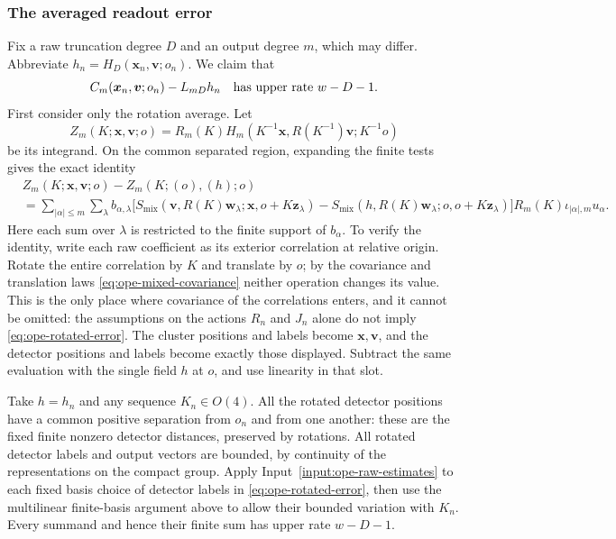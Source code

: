 \subsubsection{The averaged readout error}
Fix a raw truncation degree $D$ and an output degree $m$, which may differ.
Abbreviate
$h_n=H_D(\boldsymbol x_n,\boldsymbol v;o_n)$. We claim that
\begin{equation}\label{eq:ope-average-bridge}
 C_m(\boldsymbol x_n,\boldsymbol v;o_n)-L_{mD}h_n
                 \quad\hbox{has upper rate }w-D-1.
\end{equation}
First consider only the rotation average. Let
\[
 Z_m(K;\boldsymbol x,\boldsymbol v;o)
       =R_m(K)H_m(K^{-1}\boldsymbol x,R(K^{-1})\boldsymbol v;K^{-1}o)
\]
be its integrand. On the common separated region, expanding the finite
tests gives the exact identity
\begin{align}
 &Z_m(K;\boldsymbol x,\boldsymbol v;o)
                  -Z_m(K;(o),(h);o)\nonumber\\
 &=\sum_{|\alpha|\leq m}\sum_\lambda b_{\alpha,\lambda}
   \bigl[S_{\mathrm{mix}}(\boldsymbol v,R(K)\boldsymbol w_\lambda;
                 \boldsymbol x,o+K\boldsymbol z_\lambda)
       -S_{\mathrm{mix}}(h,R(K)\boldsymbol w_\lambda;
                 o,o+K\boldsymbol z_\lambda)\bigr]
                         R_m(K)\iota_{|\alpha|,m}u_\alpha.
 \label{eq:ope-rotated-error}
\end{align}
Here each sum over $\lambda$ is restricted to the finite support of
$b_\alpha$. To verify the identity, write each raw coefficient as its
exterior correlation at relative origin. Rotate the entire correlation
by $K$ and translate by $o$; by the covariance and translation laws
\eqref{eq:ope-mixed-covariance} neither operation changes its value.
This is the only place where covariance of the correlations enters,
and it cannot be omitted: the assumptions on the actions $R_n$ and $J_n$
alone do not imply \eqref{eq:ope-rotated-error}. The cluster positions and labels become
$\boldsymbol x,\boldsymbol v$, and the detector positions and labels
become exactly those displayed. Subtract the same evaluation with the
single field $h$ at $o$, and use linearity in that slot.

Take $h=h_n$ and any sequence $K_n\in O(4)$. All the rotated detector
positions have a common positive separation from $o_n$ and from one
another: these are the fixed finite nonzero detector distances, preserved
by rotations. All rotated detector labels and output vectors are bounded,
by continuity of the representations on the compact group. Apply
Input~\ref{input:ope-raw-estimates} to each fixed basis choice of detector
labels in \eqref{eq:ope-rotated-error}, then use the multilinear
finite-basis argument above to allow their bounded variation with $K_n$.
Every summand and hence their finite sum has upper rate $w-D-1$.

